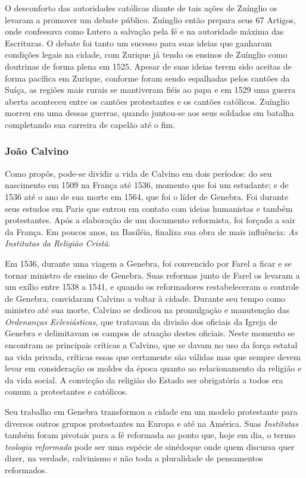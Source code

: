 \documentclass[
    article,            %
	12pt,				%
	oneside,			%
	a4paper,			%
	chapter=TITLE,		%
	section=TITLE,		%
	english,			%
	french,				%
	spanish,			%
	brazil				%
	]{abntex2}
\begin{document}
O desconforto das autoridades católicas diante de tais ações de Zuínglio os levaram a promover um debate público. Zuínglio então prepara seus 67 Artigos, onde confessava como Lutero a salvação pela fé e na autoridade máxima das Escrituras. O debate foi tanto um sucesso para suas ideias que ganharam condições legais na cidade, com Zurique já tendo os ensinos de Zuínglio como doutrinas de forma plena em 1525. Apesar de suas ideias terem sido aceitas de forma pacífica em Zurique, conforme foram sendo espalhadas pelos cantões da Suíça, as regiões mais rurais se mantiveram fiéis ao papa e em 1529 uma guerra aberta aconteceu entre os cantões protestantes e os cantões católicos. Zuínglio morreu em uma dessas guerras, quando juntou-se aos seus soldados em batalha completando sua carreira de capelão até o fim.

\subsubsection{João Calvino}
Como  propôs, pode-se dividir a vida de Calvino em dois períodos: do seu nascimento em 1509 na França até 1536, momento que foi um estudante; e de 1536 até o ano de sua morte em 1564, que foi o líder de Genebra. Foi durante seus estudos em Paris que entrou em contato com ideias humanistas e também protestantes. Após a elaboração de um documento reformista, foi forçado a sair da França. Em poucos anos, na Basiléia, finaliza sua obra de mais influência: \emph{As Institutas da Religião Cristã}.

Em 1536, durante uma viagem a Genebra, foi convencido por Farel a ficar e se tornar ministro de ensino de Genebra. Suas reformas junto de Farel os levaram a um exílio entre 1538 a 1541, e quando os reformadores restabeleceram o controle de Genebra, convidaram Calvino a voltar à cidade. Durante seu tempo como ministro até sua morte, Calvino se dedicou na promulgação e manutenção das \emph{Ordenanças Eclesiásticas}, que tratavam da divisão dos oficiais da Igreja de Genebra e delimitavam os campos de atuação destes oficiais. Neste momento se encontram as principais críticas a Calvino, que se davam no uso da força estatal na vida privada, críticas essas que certamente são válidas mas que sempre devem levar em consideração os moldes da época quanto ao relacionamento da religião e da vida social. A convicção da religião do Estado ser obrigatória a todos era comum a protestantes e católicos. 

Seu trabalho em Genebra transformou a cidade em um modelo protestante para diversos outros grupos protestantes na Europa e até na América. Suas \emph{Institutas} também foram pivotais para a fé reformada ao ponto que, hoje em dia, o termo \emph{teologia reformada} pode ser uma espécie de sinédoque onde quem discursa quer dizer, na verdade, calvinismo e não toda a pluralidade de pensamentos reformados.
\end{document}

